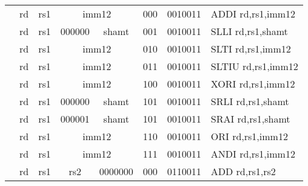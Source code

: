 \begin{table}[p]
\begin{small}
\begin{center}
\begin{tabular}{rccccccccccl}
&
\multicolumn{1}{|c|}{rd} &
\multicolumn{1}{c|}{rs1} &
\multicolumn{5}{c|}{imm12} &
\multicolumn{2}{c|}{000} &
\multicolumn{1}{c|}{0010011} & ADDI rd,rs1,imm12 \\
\cline{2-11}
  

&
\multicolumn{1}{|c|}{rd} &
\multicolumn{1}{c|}{rs1} &
\multicolumn{2}{c|}{000000} &
\multicolumn{3}{c|}{shamt} &
\multicolumn{2}{c|}{001} &
\multicolumn{1}{c|}{0010011} & SLLI rd,rs1,shamt \\
\cline{2-11}
  

&
\multicolumn{1}{|c|}{rd} &
\multicolumn{1}{c|}{rs1} &
\multicolumn{5}{c|}{imm12} &
\multicolumn{2}{c|}{010} &
\multicolumn{1}{c|}{0010011} & SLTI rd,rs1,imm12 \\
\cline{2-11}
  

&
\multicolumn{1}{|c|}{rd} &
\multicolumn{1}{c|}{rs1} &
\multicolumn{5}{c|}{imm12} &
\multicolumn{2}{c|}{011} &
\multicolumn{1}{c|}{0010011} & SLTIU rd,rs1,imm12 \\
\cline{2-11}
  

&
\multicolumn{1}{|c|}{rd} &
\multicolumn{1}{c|}{rs1} &
\multicolumn{5}{c|}{imm12} &
\multicolumn{2}{c|}{100} &
\multicolumn{1}{c|}{0010011} & XORI rd,rs1,imm12 \\
\cline{2-11}
  

&
\multicolumn{1}{|c|}{rd} &
\multicolumn{1}{c|}{rs1} &
\multicolumn{2}{c|}{000000} &
\multicolumn{3}{c|}{shamt} &
\multicolumn{2}{c|}{101} &
\multicolumn{1}{c|}{0010011} & SRLI rd,rs1,shamt \\
\cline{2-11}
  

&
\multicolumn{1}{|c|}{rd} &
\multicolumn{1}{c|}{rs1} &
\multicolumn{2}{c|}{000001} &
\multicolumn{3}{c|}{shamt} &
\multicolumn{2}{c|}{101} &
\multicolumn{1}{c|}{0010011} & SRAI rd,rs1,shamt \\
\cline{2-11}
  

&
\multicolumn{1}{|c|}{rd} &
\multicolumn{1}{c|}{rs1} &
\multicolumn{5}{c|}{imm12} &
\multicolumn{2}{c|}{110} &
\multicolumn{1}{c|}{0010011} & ORI rd,rs1,imm12 \\
\cline{2-11}
  

&
\multicolumn{1}{|c|}{rd} &
\multicolumn{1}{c|}{rs1} &
\multicolumn{5}{c|}{imm12} &
\multicolumn{2}{c|}{111} &
\multicolumn{1}{c|}{0010011} & ANDI rd,rs1,imm12 \\
\cline{2-11}
  

&
\multicolumn{1}{|c|}{rd} &
\multicolumn{1}{c|}{rs1} &
\multicolumn{1}{c|}{rs2} &
\multicolumn{4}{c|}{0000000} &
\multicolumn{2}{c|}{000} &
\multicolumn{1}{c|}{0110011} & ADD rd,rs1,rs2 \\
\cline{2-11}
  


\end{tabular}
\end{center}
\end{small}
\end{table}
